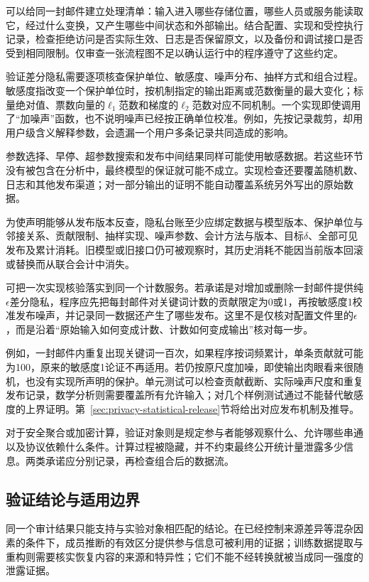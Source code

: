 可以给同一封邮件建立处理清单：输入进入哪些存储位置，哪些人员或服务能读取它，经过什么变换，又产生哪些中间状态和外部输出。结合配置、实现和受控执行记录，检查拒绝访问是否实际生效、日志是否保留原文，以及备份和调试接口是否受到相同限制。仅审查一张流程图不足以确认运行中的程序遵守了这些约定。

验证差分隐私需要逐项核查保护单位、敏感度、噪声分布、抽样方式和组合过程。敏感度指改变一个保护单位时，按机制指定的输出距离或范数衡量的最大变化；标量绝对值、票数向量的$\ell_1$范数和梯度的$\ell_2$范数对应不同机制。一个实现即使调用了“加噪声”函数，也不说明噪声已经按正确单位校准。例如，先按记录裁剪，却用用户级含义解释参数，会遗漏一个用户多条记录共同造成的影响。

参数选择、早停、超参数搜索和发布中间结果同样可能使用敏感数据。若这些环节没有被包含在分析中，最终模型的保证就可能不成立。实现检查还要覆盖随机数、日志和其他发布渠道；对一部分输出的证明不能自动覆盖系统另外写出的原始数据。

为使声明能够从发布版本反查，隐私台账至少应绑定数据与模型版本、保护单位与邻接关系、贡献限制、抽样实现、噪声参数、会计方法与版本、目标$\delta$、全部可见发布及累计消耗。旧模型或旧接口仍可被观察时，其历史消耗不能因当前版本回滚或替换而从联合会计中消失。

可把一次实现核验落实到同一个计数服务。若承诺是对增加或删除一封邮件提供纯$\epsilon$差分隐私，程序应先把每封邮件对关键词计数的贡献限定为0或1，再按敏感度1校准发布噪声，并记录同一数据还产生了哪些发布。这里不是仅核对配置文件里的$\epsilon$，而是沿着“原始输入如何变成计数、计数如何变成输出”核对每一步。

例如，一封邮件内重复出现关键词一百次，如果程序按词频累计，单条贡献就可能为100，原来的敏感度1论证不再适用。若仍按原尺度加噪，即使输出肉眼看来很随机，也没有实现所声明的保护。单元测试可以检查贡献截断、实际噪声尺度和重复发布记录，数学分析则需要覆盖所有允许输入；对几个样例测试通过不能替代敏感度的上界证明。第~\ref{sec:privacy-statistical-release}节将给出对应发布机制及推导。

对于安全聚合或加密计算，验证对象则是规定参与者能够观察什么、允许哪些串通以及协议依赖什么条件。计算过程被隐藏，并不约束最终公开统计量泄露多少信息。两类承诺应分别记录，再检查组合后的数据流。

\subsection{验证结论与适用边界}
\label{sec:privacy-verification-evidence}

同一个审计结果只能支持与实验对象相匹配的结论。在已经控制来源差异等混杂因素的条件下，成员推断的有效区分提供参与信息可被利用的证据；训练数据提取与重构则需要核实恢复内容的来源和特异性；它们不能不经转换就被当成同一强度的泄露证据。

